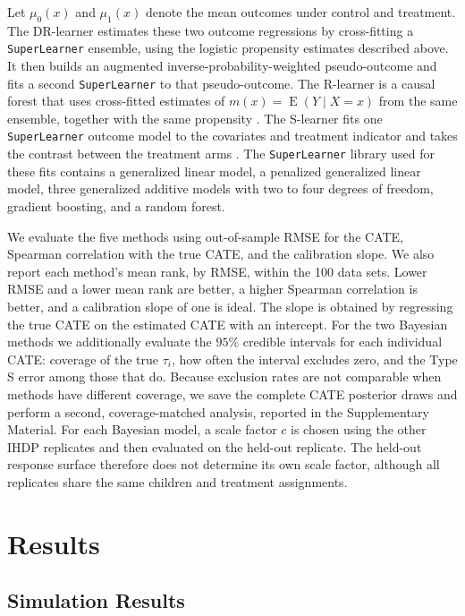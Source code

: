 \documentclass[12pt]{article}
\begin{document}
Let $\mu_0(x)$ and $\mu_1(x)$ denote the mean outcomes under control and treatment. The DR-learner estimates these two outcome regressions by cross-fitting a \texttt{SuperLearner} ensemble, using the logistic propensity estimates described above. It then builds an augmented inverse-probability-weighted pseudo-outcome \citep{kennedy2020optimal} and fits a second \texttt{SuperLearner} to that pseudo-outcome. The R-learner is a causal forest that uses cross-fitted estimates of $m(x)=\operatorname{E}(Y\mid X=x)$ from the same ensemble, together with the same propensity \citep{nie2021quasi}. The S-learner fits one \texttt{SuperLearner} outcome model to the covariates and treatment indicator and takes the contrast between the treatment arms \citep{kunzel2019metalearners}. The \texttt{SuperLearner} library used for these fits contains a generalized linear model, a penalized generalized linear model, three generalized additive models with two to four degrees of freedom, gradient boosting, and a random forest.

We evaluate the five methods using out-of-sample RMSE for the CATE, Spearman correlation with the true CATE, and the calibration slope. We also report each method's mean rank, by RMSE, within the 100 data sets. Lower RMSE and a lower mean rank are better, a higher Spearman correlation is better, and a calibration slope of one is ideal. The slope is obtained by regressing the true CATE on the estimated CATE with an intercept. For the two Bayesian methods we additionally evaluate the $95\%$ credible intervals for each individual CATE: coverage of the true $\tau_i$, how often the interval excludes zero, and the Type S error among those that do. Because exclusion rates are not comparable when methods have different coverage, we save the complete CATE posterior draws and perform a second, coverage-matched analysis, reported in the Supplementary Material. For each Bayesian model, a scale factor $c$ is chosen using the other IHDP replicates and then evaluated on the held-out replicate. The held-out response surface therefore does not determine its own scale factor, although all replicates share the same children and treatment assignments.


\newpage
\section{Results}
\label{sec:results}

\subsection{Simulation Results}
\end{document}
